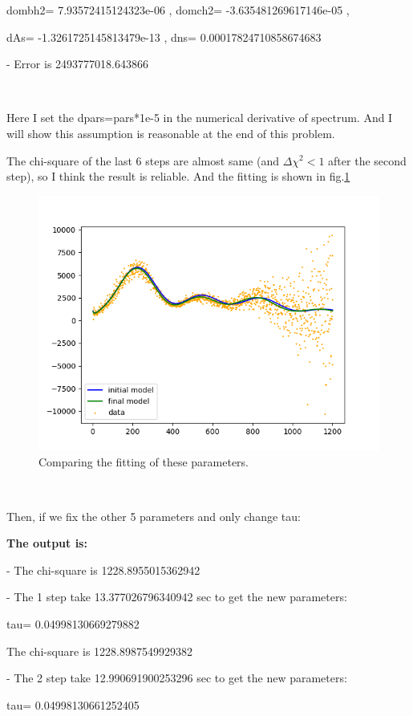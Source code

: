 \documentclass[showpacs, oneside, onecolumn, prl, amsmath, amssymb, nofootinbib, superscriptaddress, notitlepage]{revtex4-1}
\newcommand\bfig{\begin{figure}}
\newcommand\efig{\end{figure}}
\begin{document}
dombh2= 7.93572415124323e-06 , domch2= -3.635481269617146e-05 ,

dAs= -1.3261725145813479e-13 , dns= 0.00017824710858674683


- Error is  2493777018.643866


~~~~

Here I set the dpars=pars*1e-5 in the numerical derivative of spectrum. And I will show this assumption is reasonable at the end of this problem.

The chi-square of the last 6 steps are almost same (and $\Delta\chi^2<1$ after the second step), so I think the result is reliable. And the fitting is shown in fig.\ref{3-3}

\bfig
	\centering
	\includegraphics[scale=1]{3-3-1.png}
	\caption{Comparing the fitting of these parameters.}
	\label{3-3}
\efig





~~~~

Then, if we fix the other 5 parameters and only change tau:

\textbf{The output is:}

- The chi-square is 1228.8955015362942


- The 1 step take  13.377026796340942 sec to get the new parameters:

tau= 0.04998130669279882

The chi-square is 1228.8987549929382


- The 2 step take  12.990691900253296 sec to get the new parameters:

tau= 0.04998130661252405
\end{document}
